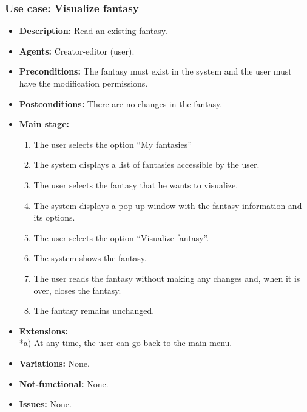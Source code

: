\subsubsection{Use case: Visualize fantasy}
\begin{itemize}
	\item \textbf{Description:} Read an existing fantasy.
	\item \textbf{Agents:} Creator-editor (user).
	\item \textbf{Preconditions:} The fantasy must exist in the system and the user must have the modification permissions.
	\item \textbf{Postconditions:} There are no changes in the fantasy.
	\item \textbf{Main stage:}
	\begin{enumerate}
		\item The user selects the option ``My fantasies''
		\item The system displays a list of fantasies accessible by the user.
		\item The user selects the fantasy that he wants to visualize.
		\item The system displays a pop-up window with the fantasy information and its options.
		\item The user selects the option ``Visualize fantasy''.
		\item The system shows the fantasy.
		\item The user reads the fantasy without making any changes and, when it is over, closes the fantasy.
		\item The fantasy remains unchanged.
	\end{enumerate}
	\item \textbf{Extensions:} \\ *a) At any time, the user can go back to the main menu.
	\item \textbf{Variations:} None.
	\item \textbf{Not-functional:} None.
	\item \textbf{Issues:} None.
\end{itemize}

